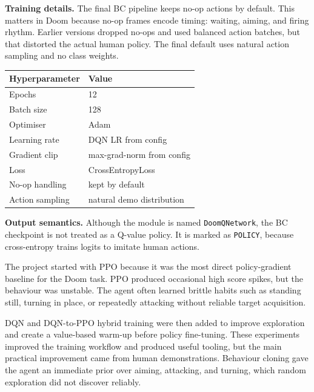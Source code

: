 \documentclass[10.5pt,twocolumn,a4paper]{article}
\makeatletter
\renewcommand\section{\@startsection{section}{1}{\z@}{7pt plus 2pt}{3pt}{\normalfont\large\bfseries}}
\makeatother
\begin{document}
\textbf{Training details.} The final BC pipeline keeps no-op actions by default. This matters in Doom because no-op frames encode timing: waiting, aiming, and firing rhythm. Earlier versions dropped no-ops and used balanced action batches, but that distorted the actual human policy. The final default uses natural action sampling and no class weights.

\begin{center}\small
\begin{tabular}{ll}
\hline
\textbf{Hyperparameter} & \textbf{Value} \\
\hline
Epochs & 12 \\
Batch size & 128 \\
Optimiser & Adam \\
Learning rate & DQN LR from config \\
Gradient clip & max-grad-norm from config \\
Loss & CrossEntropyLoss \\
No-op handling & kept by default \\
Action sampling & natural demo distribution \\
\hline
\end{tabular}
\end{center}

\textbf{Output semantics.} Although the module is named \texttt{DoomQNetwork}, the BC checkpoint is not treated as a Q-value policy. It is marked as \texttt{POLICY}, because cross-entropy trains logits to imitate human actions.

\section{Developer Journey}

The project started with PPO because it was the most direct policy-gradient baseline for the Doom task. PPO produced occasional high score spikes, but the behaviour was unstable. The agent often learned brittle habits such as standing still, turning in place, or repeatedly attacking without reliable target acquisition.

DQN and DQN-to-PPO hybrid training were then added to improve exploration and create a value-based warm-up before policy fine-tuning. These experiments improved the training workflow and produced useful tooling, but the main practical improvement came from human demonstrations. Behaviour cloning gave the agent an immediate prior over aiming, attacking, and turning, which random exploration did not discover reliably.
\end{document}
